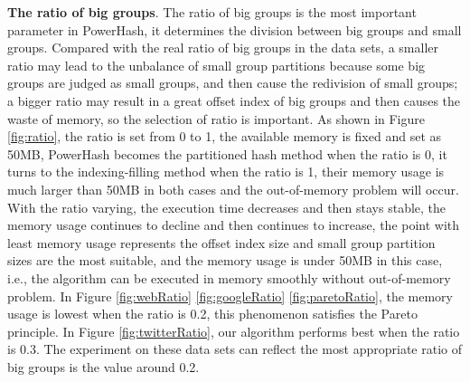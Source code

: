 \textbf{The ratio of big groups}. The ratio of big groups is the most important parameter in PowerHash, it determines the division between big groups and small groups. Compared with the real ratio of big groups in the data sets, a smaller ratio may lead to the unbalance of small group partitions because some big groups are judged as small groups, and then cause the redivision of small groups; a bigger ratio may result in a great offset index of big groups and then causes the waste of memory, so the selection of ratio is important. As shown in Figure \ref{fig:ratio}, the ratio is set from 0 to 1, the available memory is fixed and set as 50MB, PowerHash becomes the partitioned hash method when the ratio is 0, it turns to the indexing-filling method when the ratio is 1, their memory usage is much larger than 50MB in both cases and the out-of-memory problem will occur. With the ratio varying, the execution time decreases and then stays stable, the memory usage continues to decline and then continues to increase, the point with least memory usage represents the offset index size and small group partition sizes are the most suitable, and the memory usage is under 50MB in this case, i.e., the algorithm can be executed in memory smoothly without out-of-memory problem. In Figure \ref{fig:webRatio} \ref{fig:googleRatio} \ref{fig:paretoRatio}, the memory usage is lowest when the ratio is 0.2, this phenomenon satisfies the Pareto principle. In Figure \ref{fig:twitterRatio}, our algorithm performs best when the ratio is 0.3. The experiment on these data sets can reflect the most appropriate ratio of big groups is the value around 0.2.
 

